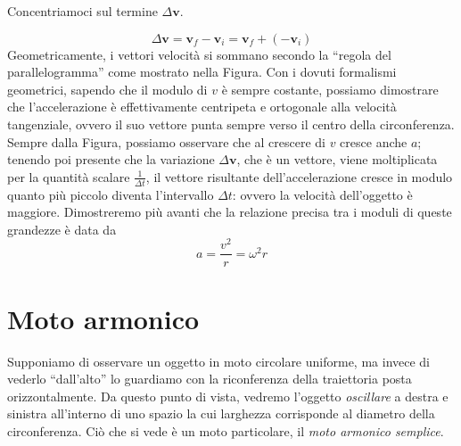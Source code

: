 \noindent Concentriamoci sul termine $\Delta\mathbf{v}$.

\[ \Delta\mathbf{v} = \mathbf{v}_f - \mathbf{v}_i = \mathbf{v}_f + (-\mathbf{v}_i) \]
Geometricamente, i vettori velocità si sommano secondo la ``regola del parallelogramma''
come mostrato nella Figura. Con i dovuti formalismi geometrici, sapendo che il
modulo di $v$ è sempre costante, possiamo dimostrare che l'accelerazione è
effettivamente centripeta e ortogonale alla velocità tangenziale, ovvero il
suo vettore punta sempre verso il centro della circonferenza. Sempre dalla Figura,
possiamo osservare che al crescere di $v$ cresce anche $a$; tenendo poi
presente che la variazione $\Delta \mathbf{v}$, che è un vettore,
viene moltiplicata per la quantità scalare $\frac{1}{\Delta t}$, il vettore
risultante dell'accelerazione cresce in modulo quanto più piccolo diventa
l'intervallo $\Delta t$: ovvero la velocità dell'oggetto è maggiore.
Dimostreremo più
avanti che la relazione precisa tra i moduli di queste grandezze è data da
\[ a = \frac{v^2}{r} = \omega^2 r \]

\section{Moto armonico}
Supponiamo di osservare un oggetto in moto circolare uniforme, ma invece di
vederlo ``dall'alto'' lo guardiamo con la riconferenza della traiettoria
posta orizzontalmente. Da questo punto di vista, vedremo l'oggetto \textit{oscillare}
a destra e sinistra all'interno di uno spazio la cui larghezza corrisponde al
diametro della circonferenza. Ciò che si vede è un moto particolare, il
\textit{moto armonico semplice}.

